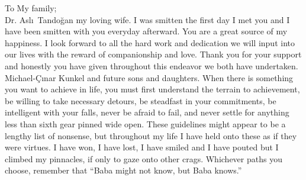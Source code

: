To My family; \\
Dr. Asl\i \ Tando\u{g}an my loving wife. I was smitten the first day I met you and I have been smitten with you everyday afterward. You are a great source of my happiness. I look forward to all the hard work and dedication we will input into our lives with the reward of companionship and love. Thank you for your support and honestly you have given throughout this endeavor we both have undertaken. \\
Michael-\c{C}\i nar Kunkel and future sons and daughters. When there is something you want to achieve in life, you must first understand the terrain to achievement, be willing to take necessary detours, be steadfast in your commitments, be intelligent with your falls, never be afraid to fail, and never settle for anything less than sixth gear pinned wide open. These guidelines might appear to be a lengthy list of nonsense, but throughout my life I have held onto these as if they were virtues. I have won, I have lost, I have smiled and I have pouted but I climbed my pinnacles, if only to gaze onto other crags. Whichever paths you choose, remember that ``Baba might not know, but Baba knows.''

\clearpage
